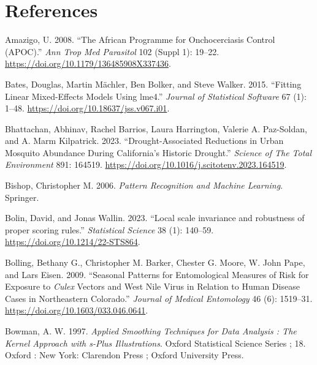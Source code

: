 \documentclass[
  letterpaper,
]{krantz}
\newlength{\cslhangindent}
\newenvironment{CSLReferences}[2] %
 {\begin{list}{}{%
  \setlength{\itemindent}{0pt}
  \setlength{\leftmargin}{0pt}
  \setlength{\parsep}{0pt}
  \ifodd #1
   \setlength{\leftmargin}{\cslhangindent}
   \setlength{\itemindent}{-1\cslhangindent}
  \fi
  \setlength{\itemsep}{#2\baselineskip}}}
 {\end{list}}
\begin{document}

\chapter*{References}\label{references}


\label{refs}
\begin{CSLReferences}{1}{0}
Amazigo, U. 2008. {``The African Programme for Onchocerciasis Control
(APOC).''} \emph{Ann Trop Med Parasitol} 102 (Suppl 1): 19--22.
\url{https://doi.org/10.1179/136485908X337436}.

Bates, Douglas, Martin Mächler, Ben Bolker, and Steve Walker. 2015.
{``Fitting Linear Mixed-Effects Models Using {lme4}.''} \emph{Journal of
Statistical Software} 67 (1): 1--48.
\url{https://doi.org/10.18637/jss.v067.i01}.

Bhattachan, Abhinav, Rachel Barrios, Laura Harrington, Valerie A.
Paz-Soldan, and A. Marm Kilpatrick. 2023. {``Drought-Associated
Reductions in Urban Mosquito Abundance During California's Historic
Drought.''} \emph{Science of The Total Environment} 891: 164519.
\url{https://doi.org/10.1016/j.scitotenv.2023.164519}.

Bishop, Christopher M. 2006. \emph{Pattern Recognition and Machine
Learning}. Springer.

Bolin, David, and Jonas Wallin. 2023. {``{Local scale invariance and
robustness of proper scoring rules}.''} \emph{Statistical Science} 38
(1): 140--59. \url{https://doi.org/10.1214/22-STS864}.

Bolling, Bethany G., Christopher M. Barker, Chester G. Moore, W. John
Pape, and Lars Eisen. 2009. {``Seasonal Patterns for Entomological
Measures of Risk for Exposure to \emph{Culex} Vectors and West Nile
Virus in Relation to Human Disease Cases in Northeastern Colorado.''}
\emph{Journal of Medical Entomology} 46 (6): 1519--31.
\url{https://doi.org/10.1603/033.046.0641}.

Bowman, A. W. 1997. \emph{Applied Smoothing Techniques for Data Analysis
: The Kernel Approach with s-Plus Illustrations}. Oxford Statistical
Science Series ; 18. Oxford : New York: Clarendon Press ; Oxford
University Press.


\end{CSLReferences}
\end{document}
